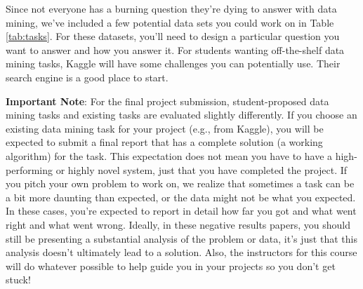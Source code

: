 \documentclass[11pt,a4paper]{article}
\begin{document}
Since not everyone has a burning question they're dying to answer with data mining, we've included a few  potential data sets you could work on in Table \ref{tab:tasks}.  For these datasets, you'll need to design a particular question you want to answer and how you answer it.  For students wanting off-the-shelf data mining tasks, Kaggle will have some challenges you can potentially use.  Their search engine is a good place to start.  

\textbf{Important Note}: For the final project submission, student-proposed data mining tasks and existing tasks are evaluated slightly differently.  If you choose an existing data mining task for your project (e.g., from Kaggle), you will be expected to submit a final report that has a complete solution (a working algorithm) for the task.  This expectation does not mean you have to have a high-performing or highly novel system, just that you have completed the project.  If you pitch your own problem to work on, we realize that sometimes a task can be a bit more daunting than expected, or the data might not be what you expected.  In these cases, you're expected to report in detail how far you got and what went right and what went wrong.  Ideally, in these negative results papers, you should still be presenting a substantial analysis of the problem or data, it's just that this analysis doesn't ultimately lead to a solution.  Also, the instructors for this course will do whatever possible to help guide you in your projects so you don't get stuck!
\end{document}
